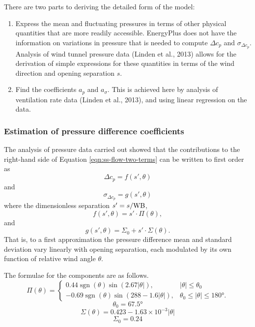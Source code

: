 There are two parts to deriving the detailed form of the model:
\begin{enumerate}
\item Express the mean and fluctuating pressures in terms of other physical quantities
that are more readily accessible. EnergyPlus does not have the information on variations
in pressure that is needed to compute $\Delta c_p$ and $\sigma_{\Delta c_p}$. Analysis
of wind tunnel pressure data (Linden et al., 2013) allows for the derivation of simple
expressions for these quantities in terms of the wind direction and opening separation
$s$.\label{ss-item-the-first}
\item Find the coefficients $a_p$ and $a_\sigma$. This is achieved here by analysis of
ventilation rate data (Linden et al., 2013), and using linear regression on the
data.\label{ss-item-the-second}
\end{enumerate}

\subsubsection{Estimation of pressure difference coefficients}
The analysis of pressure data carried out showed that the contributions to the
right-hand side of Equation \ref{eqn:ss-flow-two-terms} can be written to first order
as
\begin{equation}
\Delta c_p=f(s',\theta)
\end{equation}
and
\begin{equation}
\sigma_{\Delta c_p}=g(s',\theta)
\end{equation}
where the dimensionless separation $s' = s/\textup{WB}$,
\begin{equation}
f(s',\theta)=s'\cdot\Pi(\theta),
\end{equation}
and
\begin{equation}
g(s',\theta)=\Sigma_0+s'\cdot\Sigma(\theta).
\end{equation}
That is, to a first approximation the pressure difference mean and standard deviation vary linearly with opening separation, each modulated by its own function of relative wind angle $\theta$.

The formulae for the components are as follows.
\begin{equation}\label{eqn:ss-first-formula}
\Pi(\theta) = 
\begin{cases}
0.44\operatorname{sgn}(\theta)\sin(2.67|\theta|),& |\theta| \leq \theta_0 \\
-0.69 \operatorname{sgn}(\theta)\sin(288-1.6|\theta|),& \theta_0\leq|\theta|\leq\ang{180}.
\end{cases}
\end{equation}
\begin{equation}\label{eqn:ss-second-formula}
\theta_0 = \ang{67.5}
\end{equation}
\begin{equation}\label{eqn:ss-third-formula}
\Sigma(\theta) = 0.423 - 1.63\times 10^{-3}|\theta|
\end{equation}
\begin{equation}\label{eqn:ss-last-formula}
\Sigma_0=0.24
\end{equation}

